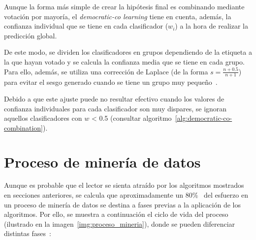Aunque la forma más simple de crear la hipótesis final es combinando mediante votación por mayoría, el \textit{democratic-co learning} tiene en cuenta, además, la confianza individual que se tiene en cada clasificador ($w_i$) a la hora de realizar la predicción global.

De este modo, se dividen los clasificadores en grupos dependiendo de la etiqueta a la que hayan votado y se calcula la confianza media que se tiene en cada grupo. Para ello, además, se utiliza una corrección de Laplace (de la forma $s=\frac{n+0\text{.}5}{n+1}$) para evitar el sesgo generado cuando se tiene un grupo muy pequeño~\cite{democraticCoLearning2004original}.

Debido a que este ajuste puede no resultar efectivo cuando los valores de confianza individuales para cada clasificador son muy dispares, se ignoran aquellos clasificadores con $w$ < 0.5 (consultar algoritmo~\ref{alg:democratic-co-combination}).


\section{Proceso de minería de datos}
\label{sec:proceso_mineria_datos}

Aunque es probable que el lector se sienta atraído por los algoritmos mostrados en secciones anteriores, se calcula que aproximadamente un 80\%~\cite{apuntesMineria} del esfuerzo en un proceso de minería de datos se destina a fases previas a la aplicación de los algoritmos. Por ello, se muestra a continuación el ciclo de vida del proceso (ilustrado en la imagen~\ref{img:proceso_mineria}), donde se pueden diferenciar distintas fases~\cite{apuntesSisint}:

